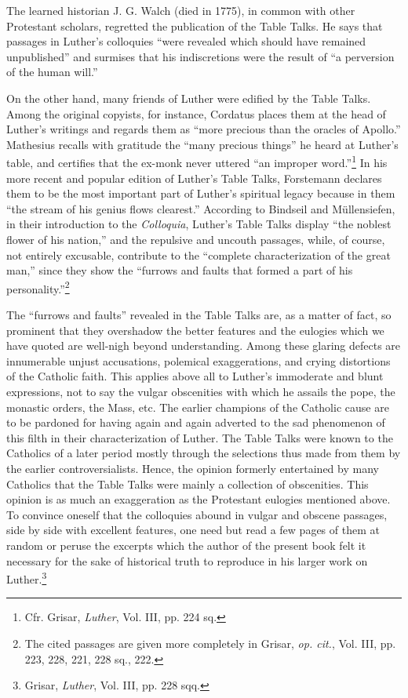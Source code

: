 The learned historian J. G. Walch (died in 1775), in common with
other Protestant scholars, regretted the publication of the Table Talks.
He says that passages in Luther’s colloquies “were revealed which
should have remained unpublished” and surmises that his indiscretions
were the result of “a perversion of the human will.”

On the other hand, many friends of Luther were edified by the
Table Talks. Among the original copyists, for instance, Cordatus
places them at the head of Luther’s writings and regards them as
“more precious than the oracles of Apollo.” Mathesius recalls with
gratitude the “many precious things” he heard at Luther’s table, and
certifies that the ex-monk never uttered “an improper word.”\footnote{Cfr. Grisar, \textit{Luther}, Vol. III, pp. 224 sq.}
In his more recent and popular edition of Luther’s Table Talks, Forstemann
declares them to be the most important part of Luther’s spiritual legacy
because in them “the stream of his genius flows clearest.”
According to Bindseil and Müllensiefen, in their introduction to the
\textit{Colloquia}, Luther’s Table Talks display “the noblest flower of his
nation,” and the repulsive and uncouth passages, while, of course,
not entirely excusable, contribute to the “complete characterization
of the great man,” since they show the “furrows and faults that
formed a part of his personality.”\footnote
{The cited passages are given more completely in Grisar, \textit{op. cit.}, Vol. III, pp. 223, 228,
221, 228 sq., 222.}

The “furrows and faults” revealed in the Table Talks are, as a matter
of fact, so prominent that they overshadow the better features and
the eulogies which we have quoted are well-nigh beyond understanding.
Among these glaring defects are innumerable unjust accusations,
polemical exaggerations, and crying distortions of the Catholic
faith. This applies above all to Luther’s immoderate and blunt
expressions, not to say the vulgar obscenities with which he assails
the pope, the monastic orders, the Mass, etc. The earlier champions
of the Catholic cause are to be pardoned for having again and
again adverted to the sad phenomenon of this filth in their characterization
of Luther. The Table Talks were known to the Catholics
of a later period mostly through the selections thus made from them
by the earlier controversialists. Hence, the opinion formerly entertained
by many Catholics that the Table Talks were mainly a collection
of obscenities. This opinion is as much an exaggeration as
the Protestant eulogies mentioned above. To convince oneself that
the colloquies abound in vulgar and obscene passages, side by side
with excellent features, one need but read a few pages of them at random
or peruse the excerpts which the author of the present book
felt it necessary for the sake of historical truth to reproduce in his
larger work on Luther.\footnote{Grisar, \textit{Luther}, Vol. III, pp. 228 sqq.}

